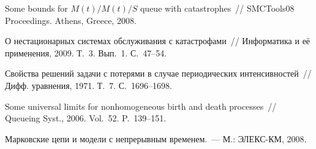 \begin{multicols}{2}
{{\begin{thebibliography}{9}
Some bounds for $M(t)/M(t)/S$ queue with catastrophes~//
SMCTools08 Proceedings.  Athens, Greece, 2008.

О нестационарных системах обслуживания с катастрофами~// Информатика и её применения, 2009. Т.~3. Вып.~1. С.~47--54.

Свойства решений задачи с потерями в случае периодических
интенсивностей~// Дифф. уравнения, 1971. Т.~7. С.~1696--1698.

Some universal limits for nonhomogeneous birth and death processes~//
Queueing Syst., 2006. Vol.~52. P.~139--151.

\label{end\stat}

Марковские цепи и модели с непрерывным временем.~--- М.: ЭЛЕКС-КМ, 2008.
\end{thebibliography}
}
}
\end{multicols}